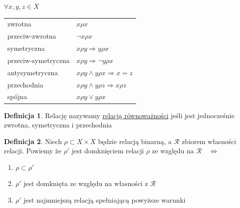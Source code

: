\documentclass[12pt,a4paper]{article}
\theoremstyle{definition}
\newtheorem{df}{Definicja}
\theoremstyle{remark}
\begin{document}
$\forall x,y,z \in X$
\begin{listliketab}
\begin{tabular}{ll}
	\textbullet  zwrotna & $x \rho x$ \\
	\textbullet  przeciw-zwrotna & $\neg x\rho x$ \\
	\textbullet  symetryczna & $x\rho y \Rightarrow y\rho x$ \\
	\textbullet  przeciw-symetryczna & $x \rho y \Rightarrow \neg y\rho x $ \\
	\textbullet  antysymetryczna & $x\rho y \wedge y\rho x \Rightarrow x= z$ \\
	\textbullet  przechodnia & $x\rho y \wedge y\rho z \Rightarrow x\rho z$ \\
	\textbullet  spójna & $ x\rho y \vee y\rho x $ \\
\end{tabular}
\end{listliketab}

\begin{df}
Relację nazywamy \href{http://pl.wikipedia.org/wiki/Relacja_r%C3%B3wnowa%C5%BCno%C5%9Bci}{relacją równoważności}
jeśli jest jednocześnie zwrotna, symetryczna i przechodnia
\end{df}

\begin{df}
Niech $\rho\subset X\times X$ będzie relacją binarną, a $\mathcal{R}$ zbiorem własności relacji. Powiemy że $\rho'$ jest domknięciem relacji $\rho$
ze względu na $\mathcal{R} \quad \Leftrightarrow$
\begin{enumerate}
	\item $\rho \subset \rho'$
	\item $\rho'$ jest domknięta ze względu na własności z $\mathcal{R}$
	\item $\rho'$ jest najmniejszą relacją spełniającą powyższe warunki
\end{enumerate}
\end{df}
\end{document}
